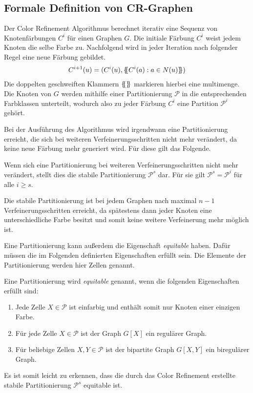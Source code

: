 \subsection{Formale Definition von CR-Graphen}
Der Color Refinement Algorithmus berechnet iterativ eine Sequenz von Knotenfärbungen $C^i$ für einen Graphen $G$.
Die initiale Färbung $C^i$ weist jedem Knoten die selbe Farbe zu.
Nachfolgend wird in jeder Iteration nach folgender Regel eine neue Färbung gebildet.
\begin{equation}
C^{i+1}(u)=(C^i(u),\{\mskip-5mu\{ C^i(a):a\in N(u)\}\mskip-5mu\} )
\label{eq:1}
\end{equation}
Die doppelten geschweiften Klammern $\{\mskip-5mu\{ \}\mskip-5mu\} $ markieren hierbei eine \gls{multimenge}.
Die Knoten von $G$ werden mithilfe einer Partitionierung $\mathcal{P}$ in die entsprechenden Farbklassen unterteilt, wodurch also zu jeder Färbung $C^i$ eine Partition $\mathcal{P}^i$ gehört.

Bei der Ausführung des Algorithmus wird irgendwann eine Partitionierung erreicht, die sich bei weiteren Verfeinerungsschritten nicht mehr verändert, da keine neue Färbung mehr generiert wird.
Für diese gilt das Folgende.
\begin{Definition}
	Wenn sich eine Partitionierung bei weiteren Verfeinerungsschritten nicht mehr verändert, stellt dies die stabile Partitionierung $\mathcal{P}^s$ dar.
	Für sie gilt $\mathcal{P}^s=\mathcal{P}^i$ für alle $i\geq s$.
\end{Definition}
Die stabile Partitionierung ist bei jedem Graphen nach maximal $n-1$ Verfeinerungsschritten erreicht, da spätestens dann jeder Knoten eine unterschiedliche Farbe besitzt und somit keine weitere Verfeinerung mehr möglich ist.

Eine Partitionierung kann außerdem die Eigenschaft \emph{equitable} haben.
Dafür müssen die im Folgenden definierten Eigenschaften erfüllt sein.
Die Elemente der Partitionierung werden hier Zellen genannt.
\begin{Definition}
	Eine Partitionierung wird \emph{equitable} genannt, wenn die folgenden Eigenschaften erfüllt sind:
	\begin{enumerate}
		\item Jede Zelle $X\in \mathcal{P}$ ist einfarbig und enthält somit nur Knoten einer einzigen Farbe.
		\item Für jede Zelle $X\in \mathcal{P}$ ist der Graph $G[X]$ ein regulärer Graph.
		\item Für beliebige Zellen $X,Y\in \mathcal{P}$ ist der bipartite Graph $G[X,Y]$ ein biregulärer Graph.
	\end{enumerate}
\end{Definition}
Es ist somit leicht zu erkennen, dass die durch das Color Refinement erstellte stabile Partitionierung $\mathcal{P}^s$ equitable ist.

